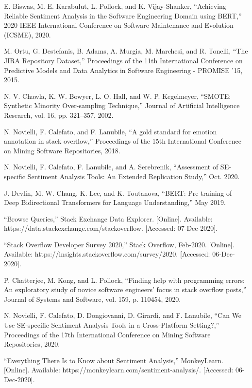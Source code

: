 \documentclass[conference]{IEEEtran}
\begin{document}
\begin{thebibliography}{00}
 E. Biswas, M. E. Karabulut, L. Pollock, and K. Vijay-Shanker, “Achieving Reliable Sentiment Analysis in the Software Engineering Domain using BERT,” 2020 IEEE International Conference on Software Maintenance and Evolution (ICSME), 2020.

 M. Ortu, G. Destefanis, B. Adams, A. Murgia, M. Marchesi, and R. Tonelli, “The JIRA Repository Dataset,” Proceedings of the 11th International Conference on Predictive Models and Data Analytics in Software Engineering - PROMISE '15, 2015.

  N. V. Chawla, K. W. Bowyer, L. O. Hall, and W. P. Kegelmeyer, “SMOTE: Synthetic Minority Over-sampling Technique,” Journal of Artificial Intelligence Research, vol. 16, pp. 321–357, 2002. 

 N. Novielli, F. Calefato, and F. Lanubile, “A gold standard for emotion annotation in stack overflow,” Proceedings of the 15th International Conference on Mining Software Repositories, 2018. 

 N. Novielli, F. Calefato, F. Lanubile, and A. Serebrenik, “Assessment of SE-specific Sentiment Analysis Tools: An Extended Replication Study,” Oct. 2020.

 J. Devlin, M.-W. Chang, K. Lee, and K. Toutanova, “BERT: Pre-training of Deep Bidirectional Transformers for Language Understanding,” May 2019. 

 “Browse Queries,” Stack Exchange Data Explorer. [Online]. Available: https://data.stackexchange.com/stackoverflow. [Accessed: 07-Dec-2020]. 

 “Stack Overflow Developer Survey 2020,” Stack Overflow, Feb-2020. [Online]. Available: https://insights.stackoverflow.com/survey/2020. [Accessed: 06-Dec-2020]. 

 P. Chatterjee, M. Kong, and L. Pollock, “Finding help with programming errors: An exploratory study of novice software engineers’ focus in stack overflow posts,” Journal of Systems and Software, vol. 159, p. 110454, 2020. 

 N. Novielli, F. Calefato, D. Dongiovanni, D. Girardi, and F. Lanubile, “Can We Use SE-specific Sentiment Analysis Tools in a Cross-Platform Setting?,” Proceedings of the 17th International Conference on Mining Software Repositories, 2020. 

 “Everything There Is to Know about Sentiment Analysis,” MonkeyLearn. [Online]. Available: https://monkeylearn.com/sentiment-analysis/. [Accessed: 06-Dec-2020]. 


\end{thebibliography}
\end{document}

